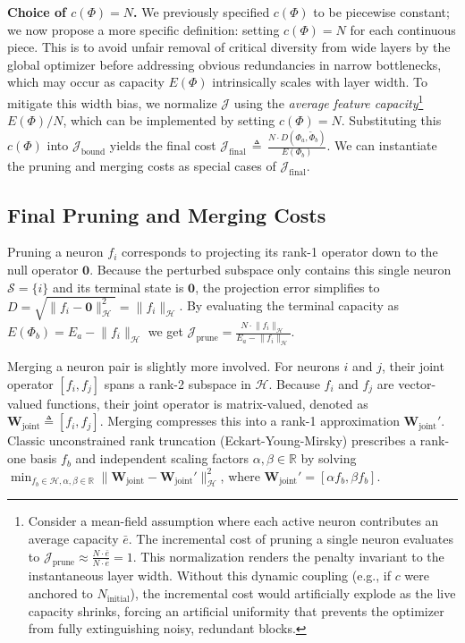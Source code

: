 \documentclass[11pt, a4paper, copyright, gdm]{google}
\newcommand{\normshort}[1]{\lVert#1\rVert}
\newcommand{\zeroVect}{\boldsymbol{0}}
\newcommand{\calH}{\mathcal{H}}
\newcommand{\calJ}{\mathcal{J}}
\newcommand{\calS}{\mathcal{S}}
\newcommand{\R}{\mathbb{R}}
\newcommand{\Wall}{\boldsymbol{W}_{\text{joint}}}
\theoremstyle{definition}
\begin{document}
\noindent\textbf{Choice of $c(\Phi)=N$.} We previously specified $c(\Phi)$ to be piecewise constant; we now propose a more specific definition: setting $c(\Phi)=N$ for each continuous piece. This is to avoid unfair removal of critical diversity from wide layers by the global optimizer before addressing obvious redundancies in narrow bottlenecks, which may occur as capacity $E(\Phi)$ intrinsically scales with layer width. To mitigate this width bias, we normalize $\calJ$ using the \textit{average feature capacity}\footnote{Consider a mean-field assumption where each active neuron contributes an average capacity $\bar{e}$. The incremental cost of pruning a single neuron evaluates to $\calJ_{\text{prune}} \approx \frac{N \cdot \bar{e}}{N \cdot \bar{e}} = 1$. This normalization renders the penalty invariant to the instantaneous layer width. Without this dynamic coupling (e.g., if $c$ were anchored to $N_{\text{initial}}$), the incremental cost would artificially explode as the live capacity shrinks, forcing an artificial uniformity that prevents the optimizer from fully extinguishing noisy, redundant blocks.} $E(\Phi) / N$, which can be implemented by setting $c(\Phi)=N$. Substituting this $c(\Phi)$ into $\calJ_{\text{bound}}$ yields the final cost $\calJ_{\text{final}} \,\triangleq\, \frac{N \cdot D(\Phi_a, \tilde{\Phi}_b)}{E(\Phi_b)}$. We can instantiate the pruning and merging costs as special cases of $\calJ_{\text{final}}$.

\subsection{Final Pruning and Merging Costs}
Pruning a neuron $f_i$ corresponds to projecting its rank-1 operator down to the null operator $\zeroVect$. Because the perturbed subspace only contains this single neuron $\calS = \{i\}$ and its terminal state is $\zeroVect$, the projection error simplifies to $D = \sqrt{\normshort{f_i - \zeroVect}_{\calH}^2} = \normshort{f_i}_{\calH}$. By evaluating the terminal capacity as $E(\Phi_b) = E_a - \normshort{f_i}_{\calH}$ we get $\calJ_{\text{prune}} = \frac{N \cdot \normshort{f_i}_{\calH}}{E_a - \normshort{f_i}_{\calH}}$. 

Merging a neuron pair is slightly more involved. For neurons $i$ and $j$, their joint operator $[f_i, f_j]$ spans a rank-2 subspace in $\calH$. Because $f_i$ and $f_j$ are vector-valued functions, their joint operator is matrix-valued, denoted as $\Wall \triangleq [f_i, f_j]$. Merging compresses this into a rank-1 approximation $\Wall'$. Classic unconstrained rank truncation (Eckart-Young-Mirsky) prescribes a rank-one basis $f_b$ and independent scaling factors $\alpha, \beta \in \R$ by solving $\min_{f_b \in \calH, \alpha, \beta \in \R} \normshort{\Wall - \Wall'}^2_{\calH}$, where $\Wall' = [\alpha f_b, \beta f_b]$. 
\end{document}
